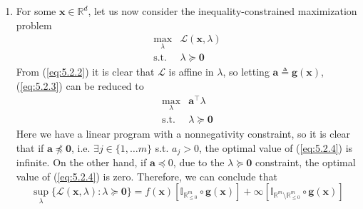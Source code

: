 \documentclass{article}
\numberwithin{equation}{section}
\begin{document}
\begin{enumerate}[label=\alph*.]
    \item
    For some $ \mathbf{x} \in \mathbb{R}^d $, let us now consider the
    inequality-constrained maximization problem
    \begin{equation} \label{eq:5.2.3}
        \begin{array}{rl}
            \displaystyle\max_\lambda & \mathcal{L}(\mathbf{x}, \lambda) \\
            \text{s.t.} & \lambda \succeq \mathbf{0}
        \end{array}
    \end{equation}
    From (\ref{eq:5.2.2}) it is clear that $ \mathcal{L} $ is affine in
    $ \lambda $, so letting $ \mathbf{a} \triangleq \mathbf{g}(\mathbf{x}) $,
    (\ref{eq:5.2.3}) can be reduced to
    \begin{equation} \label{eq:5.2.4}
        \begin{array}{rl}
            \displaystyle\max_\lambda & \mathbf{a}^\top\lambda \\
            \text{s.t.} & \lambda \succeq \mathbf{0}
        \end{array}
    \end{equation}
    Here we have a linear program with a nonnegativity constraint, so it is
    clear that if $ \mathbf{a} \not\preceq\mathbf{0} $, i.e.
    $ \exists j \in \{1, \ldots m\} $ s.t. $ a_j > 0 $, the optimal value of
    (\ref{eq:5.2.4}) is infinite. On the other hand, if
    $ \mathbf{a} \preceq {0} $, due to the $ \lambda \succeq \mathbf{0} $
    constraint, the optimal value of (\ref{eq:5.2.4}) is zero. Therefore, we
    can conclude that
    \begin{equation} \label{eq:5.2.5}
        \sup_\lambda
        \{\mathcal{L}(\mathbf{x}, \lambda) : \lambda \succeq \mathbf{0}\} =
        f(\mathbf{x})\left[
            \mathbb{I}_{\mathbb{R}_{\le 0}^m} \circ \mathbf{g}(\mathbf{x})
        \right] +
        \infty\left[
            \mathbb{I}_{\mathbb{R}^m \setminus \mathbb{R}_{\le 0}^m} \circ
            \mathbf{g}(\mathbf{x})
        \right]
    \end{equation}


\end{enumerate}
\end{document}
